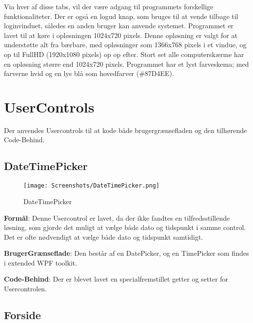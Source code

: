 Via hver af disse tabs, vil der være adgang til programmets forskellige funktionaliteter.
Der er også en logud knap, som bruges til at vende tilbage til loginvinduet, således en anden bruger kan anvende systemet.
Programmet er lavet til at køre i opløsningen 1024x720 pixels.
Denne opløsning er valgt for at understøtte alt fra bærbare, med opløsninger som 1366x768 pixels i et vindue, og op til FullHD (1920x1080 pixels) op op efter. 
Stort set alle computerskærme har en opløsning større end 1024x720 pixels\citep{resolutions}. 
Programmet har et lyst farveskema; med farverne hvid og en lys blå som hovedfarver (\#87D4EE).

\section{UserControls}
Der anvendes Usercontrols til at kode både brugergrænsefladen og den tilhørende Code-Behind.

\subsection{DateTimePicker}\label{subsec:DateTimePicker}

\begin{wrapfigure}{r}{0.5\textwidth}
    \label{img:DateTimePicker}
    \vspace{-20pt}
    \begin{center}
        \texttt{[image: Screenshots/DateTimePicker.png]}
    \end{center}
    \vspace{-15pt}
    \caption{DateTimePicker}
    \vspace{-30pt}
\end{wrapfigure}

\textbf{Formål}: 
Denne Usercontrol er lavet, da der ikke fandtes en tilfredsstillende løsning, som gjorde det muligt at vælge både dato og tidspunkt i samme control. 
Det er ofte nødvendigt at vælge både dato og tidspunkt samtidigt. 

\textbf{BrugerGrænseflade}: 
Den består af en DatePicker, og en TimePicker som findes i extended WPF toolkit.

\textbf{Code-Behind}: 
Der er blevet lavet en specialfremstillet getter og setter for Usercontrolen. 


\subsection{Forside}

